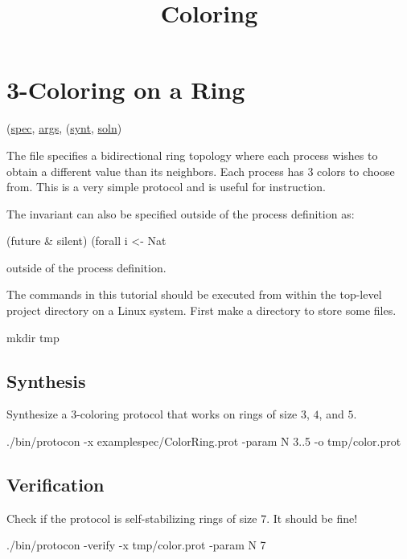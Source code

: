 
\title{Coloring}
\date{}



\tableofcontents

\section{3-Coloring on a Ring}
\label{sec:ColorRing}

(\href{\examplespec/ColorRing.prot}{spec},
\href{\examplesett/ColorRing.args}{args},
(\href{\examplespec/ColorRing.prot}{synt},
\href{\examplesoln/ColorRing.prot}{soln})

The  file specifies a bidirectional ring topology where each process wishes to obtain a different value than its neighbors.
Each process has $3$ colors to choose from.
This is a very simple protocol and is useful for instruction.

The invariant can also be specified outside of the process definition as:
\begin{code}
(future & silent)
  (forall i <- Nat %
\end{code}
outside of the process definition.

The commands in this tutorial should be executed from within the top-level project directory on a Linux system.
First make a directory  to store some files.
\begin{code}
mkdir tmp
\end{code}

\subsection{Synthesis}
Synthesize a 3-coloring protocol that works on rings of size $3$, $4$, and $5$.
\begin{code}
./bin/protocon -x examplespec/ColorRing.prot -param N 3..5 -o tmp/color.prot
\end{code}

\subsection{Verification}
Check if the protocol is self-stabilizing rings of size $7$. It should be fine!
\begin{code}
./bin/protocon -verify -x tmp/color.prot -param N 7
\end{code}

